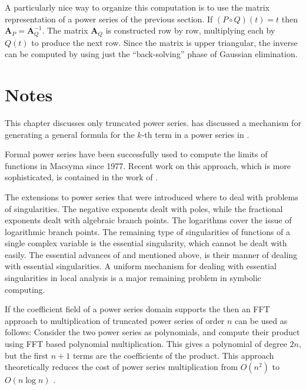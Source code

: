 A particularly nice way to organize this computation is to use the
matrix representation of a power series of the previous section.  If
$(P\circ Q)(t) = t$ then $\mathbf{A}_P = \mathbf{A}_Q^{-1}$.  The matrix
$\mathbf{A}_Q$ is constructed row by row, multiplying each by $Q(t)$ to
produce the next row.  Since the matrix is upper triangular, the
inverse can be computed by using just the ``back-solving'' phase of
Gaussian elimination.  

\section*{Notes}

\small

This chapter discusses only truncated power series.  {\Koepf} has
discussed a mechanism for generating a general formula for the
$k$-th term in a power series in \cite{Koepf1992-kr}.

 Formal power series have been successfully used to
compute the limits of functions in Macsyma since 1977.  Recent work
on this approach, which is more sophisticated, is contained in the
work of {\Shackell} \cite{Shackell1990-ws}.

The extensions to power series that were introduced where to deal with
problems of singularities.  The negative exponents dealt with poles,
while the fractional exponents dealt with algebraic branch points.
The logarithms cover the issue of logarithmic branch points.  The
remaining type of singularities of functions of a single complex variable
is the essential singularity, which cannot be dealt with easily.  The
essential advances of {\Shackell} and {\SalvyB} mentioned above, is their
manner of dealing with essential singularities.  A uniform mechanism
for dealing with essential singularities in local analysis is a major
remaining problem in symbolic computing.

If the coefficient field of a power series domain supports the
 then an FFT approach to multiplication of
truncated power series of order $n$ can be used as follows: Consider
the two power series as polynomials, and compute their product using
FFT based polynomial multiplication.  This gives a polynomial of
degree $2n$, but the first $n+1$ terms are the coefficients of the
product.  This approach theoretically reduces the cost of power series
multiplication from $O(n^2)$ to $O(n \log n)$ \cite{Knuth1997-tf,Borodin1975-de}.

